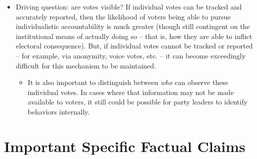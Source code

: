 \documentclass[12pt]{article}
\begin{document}
\begin{itemize}[leftmargin=*, itemsep=4pt]
    \item Driving question: are votes visible? If individual votes can be tracked and accurately reported, then the likelihood of voters being able to pursue individualistic accountability is much greater (though still contingent on the institutional means of actually doing so -- that is, how they are able to inflict electoral consequence). But, if individual votes cannot be tracked or reported -- for example, via anonymity, voice votes, etc. -- it can become exceedingly difficult for this mechanism to be maintained.
    \begin{itemize}
        \item It is also important to distinguish between \emph{who} can observe these individual votes. In cases where that information may not be made available to voters, it still could be possible for party leaders to identify behaviors internally.
    \end{itemize}
\end{itemize}


\section{Important Specific Factual Claims}
\end{document}

